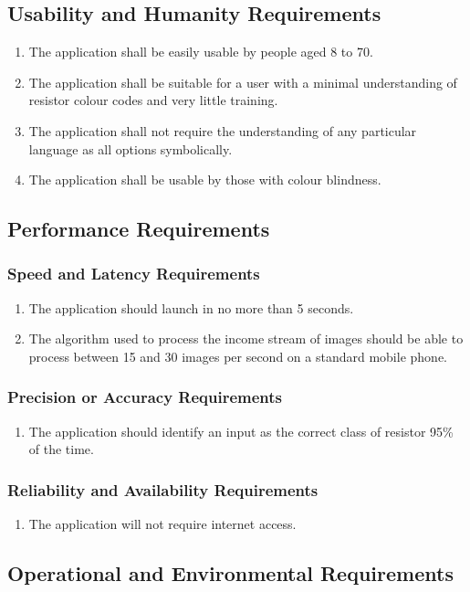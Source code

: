 \documentclass{article}
\begin{document}
\subsection{Usability and Humanity Requirements}
\begin{enumerate}
\item The application shall be easily usable by people aged 8 to 70.
\item The application shall be suitable for a user with a minimal understanding of resistor colour codes and very little training.
\item The application shall not require the understanding of any particular language as all options symbolically.
\item The application shall be usable by those with colour blindness.
\end{enumerate}
\subsection{Performance Requirements}
\subsubsection{Speed and Latency Requirements}
\begin{enumerate}
\item The application should launch in no more than 5 seconds.
\item The algorithm used to process the income stream of images should be able to process between 15 and 30 images per second on a standard mobile phone.
\end{enumerate}
\subsubsection{Precision or Accuracy Requirements}
\begin{enumerate}
\item The application should identify an input as the correct class of resistor 95\% of the time.
\end{enumerate}
\subsubsection{Reliability and Availability Requirements}
\begin{enumerate}
\item The application will not require internet access.
\end{enumerate}
\subsection{Operational and Environmental Requirements}
\end{document}
